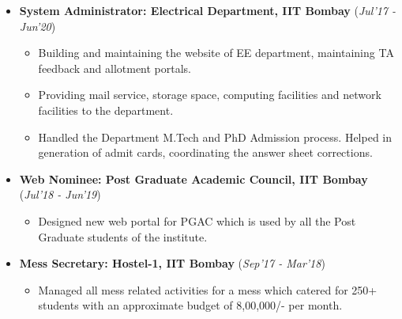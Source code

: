 \documentclass[10pt]{article}
\begin{document}
\colorbox{bl}{}

\begin{itemize}[leftmargin=0.4cm]

\item \textbf {System Administrator: Electrical Department, IIT Bombay} 
\hfill{(\textit{Jul'17 - Jun'20})}
    \begin{itemize}
	\item Building and maintaining the website of EE department, maintaining TA feedback and allotment portals.
	\item Providing mail service, storage space, computing facilities and network facilities to the department.
	\item Handled the Department M.Tech and PhD Admission process. Helped in generation of admit cards, coordinating the answer sheet corrections.
	\end{itemize}
	
	
\item \textbf{Web Nominee: Post Graduate Academic Council, IIT Bombay}
\hfill{(\textit{Jul'18 - Jun'19})}
    \begin{itemize}
			\item Designed new web portal for PGAC which is used by all the Post Graduate students of the institute. 	
	\end{itemize}
	

\item \textbf{Mess Secretary: Hostel-1, IIT Bombay}
\hfill{(\textit{Sep'17 - Mar'18})}
    \begin{itemize}
            \item Managed all mess related activities for a mess which catered for 250+ students with an approximate budget of 8,00,000/- per month.
		\end{itemize}
			


    	
\end{itemize}


\colorbox{bl}{}
\end{document}
